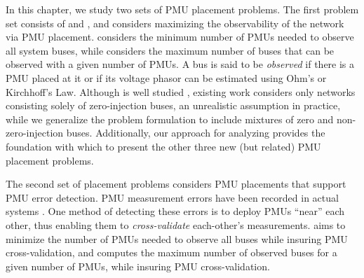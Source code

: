 In this chapter, we study two sets of PMU placement problems.  The first problem set consists of \full and \maxincs, and considers maximizing the observability of the network via PMU placement. \full considers the minimum number of PMUs needed 
to observe all system buses, while \maxinc considers the maximum number of buses that can be observed with a given number of PMUs. 
A bus is said to be {\em observed} if there is a PMU placed at it or if
its voltage phasor can be estimated using Ohm's or Kirchhoff's Law.  Although \full is well studied \cite{Baldwin93,Brueni05,Haynes02,Mili90,Xu04}, existing work considers only networks consisting solely of zero-injection buses, 
an unrealistic assumption in practice,
while we generalize the problem formulation to include mixtures of zero and  non-zero-injection buses. Additionally, our approach for analyzing \full provides the foundation with which to present the other three new (but related) PMU placement problems.

The second set of placement problems considers PMU placements that support PMU error detection. PMU measurement errors have been recorded in actual systems \cite{Vanfretti10}. 
One method of detecting these errors is to deploy PMUs ``near'' each other, thus enabling them to {\em cross-validate} each-other's measurements. 
{\xvals} aims to minimize the number of PMUs needed to observe all buses while insuring PMU cross-validation, and {\xvalparts} computes the maximum number of observed buses for a given number of PMUs, while insuring PMU cross-validation.


